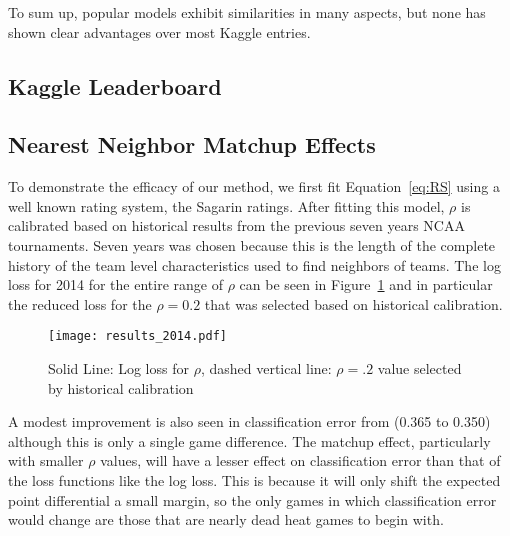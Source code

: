 To sum up, popular models exhibit similarities in many aspects,  but none has shown clear advantages over most Kaggle entries. 

\subsection{Kaggle Leaderboard}
\subsection{Nearest Neighbor Matchup Effects}
To demonstrate the efficacy of our method, we first fit Equation~\ref{eq:RS} using a well known rating system, the Sagarin ratings. After fitting this model, $\rho$ is calibrated based on historical results from the previous seven years NCAA tournaments. Seven years was chosen because this is the length of the complete history of the team level characteristics used to find neighbors of teams. The log loss for 2014 for the entire range of $\rho$ can be seen in Figure~\ref{fig:result} and in particular the reduced loss for the $\rho=0.2$ that was selected based on historical calibration.
\begin{figure}[h!]
\centering
\texttt{[image: results\_2014.pdf]}
\caption{Solid Line: Log loss for $\rho$, dashed vertical line: $\rho=.2$ value selected by historical calibration}
\label{fig:result}
\end{figure} 
A modest improvement is also seen in classification error from (0.365 to 0.350) although this is only a single game difference. The matchup effect, particularly with smaller $\rho$ values, will have a lesser effect on classification error than that of the loss functions like the log loss. This is because it will only shift the expected point differential a small margin, so the only games in which classification error would change are those that are nearly dead heat games to begin with.

